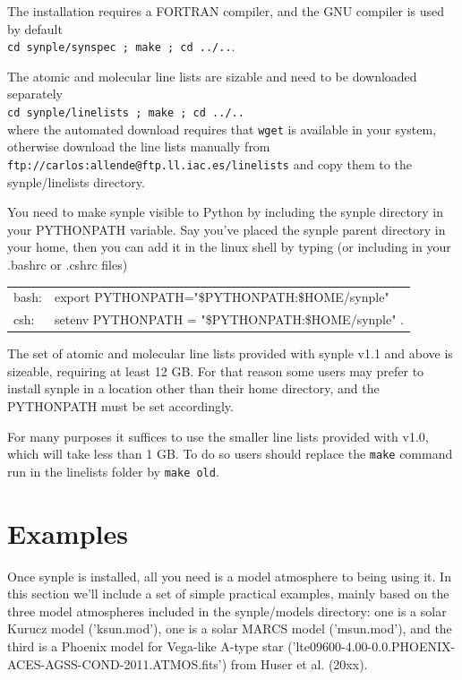 \documentclass[]{article}
\begin{document}
The installation requires a FORTRAN compiler, and the GNU compiler is used by default
\\ {\tt cd synple/synspec ; make ; cd ../..}.

The atomic and molecular line lists are sizable and need to be downloaded separately
\\ {\tt cd synple/linelists ; make ; cd ../..} \\
\noindent where the automated download requires that {\tt wget} is available in your system, otherwise download the line lists manually from \\ {\tt ftp://carlos:allende@ftp.ll.iac.es/linelists} and copy them to the synple/linelists directory.

You need to make synple visible to Python by including the synple directory in your PYTHONPATH variable. Say you've placed the synple parent directory in your home, then you can add it in the linux shell by typing (or including in your .bashrc or .cshrc files)
\begin{table}[h]
\begin{tabular}{ll}
bash: & export PYTHONPATH="\$PYTHONPATH:\$HOME/synple"  \\
csh:  & setenv PYTHONPATH = "\$PYTHONPATH:\$HOME/synple" .
\end{tabular}
\end{table}

The set of atomic and molecular line lists provided with synple v1.1 and above is sizeable, requiring at least 12 GB. For that reason some users may prefer to install synple in a location other than their home directory, and the PYTHONPATH must be set accordingly.

For many purposes it suffices to use the smaller line lists provided with v1.0, which will take less than 1 GB. To do so users should replace the {\tt make} command run in the linelists folder by {\tt make old}. 

\section{Examples}

Once synple is installed, all you need is a model atmosphere to being using it. In this section we'll include a set of simple practical examples, mainly based on the three model atmospheres included in the synple/models directory: one is a solar Kurucz model ('ksun.mod'), one is a solar MARCS model ('msun.mod'), and the third is a Phoenix model for Vega-like A-type star ('lte09600-4.00-0.0.PHOENIX-ACES-AGSS-COND-2011.ATMOS.fits') from Huser et al. (20xx).
\end{document}

